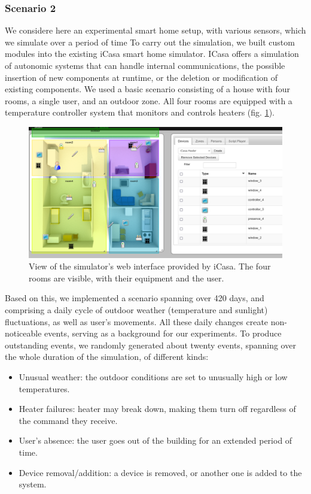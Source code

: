\documentclass[entropy,article,submit,moreauthors,pdftex]{Definitions/mdpi}
\begin{document}
\subsubsection{Scenario 2}
We considere here an experimental smart home setup, with various sensors, which we simulate over a period of time
To carry out the simulation, we built custom modules into the existing iCasa
smart home simulator\cite{lalanda_self-aware_2017}. ICasa
offers a simulation of autonomic systems that can handle internal communications,
the possible insertion of new components at runtime, or the deletion or modification of existing
components. We used a basic scenario consisting of a house with four rooms,
a single user, and an outdoor zone. All four rooms are equipped
with a temperature controller system that monitors and controls heaters (fig.
\ref{fig:view}).

\begin{figure}[ht]
    \centering
    \includegraphics[width=\linewidth]{figures/simulator}
    \caption{View of the simulator's web interface provided by iCasa. The four
        rooms are visible, with their equipment and the user.}
    \label{fig:view}
\end{figure}

Based on this, we implemented a scenario spanning over 420 days, and
comprising a daily cycle of outdoor weather (temperature and sunlight) fluctuations, as well
as user's movements. All these daily changes create non-noticeable events,
serving as a background for our experiments. To produce outstanding
events, we randomly generated about twenty events, spanning over the whole
duration of the simulation, of different kinds:

\begin{itemize}
    \item Unusual weather: the outdoor conditions are set to unusually high or
          low temperatures.
    \item Heater failures: heater may break down, making them turn off regardless
          of the command they receive.
    \item User's absence: the user goes out of the building for an extended
          period of time.
    \item Device removal/addition: a device is removed, or another one is added
          to the system.
\end{itemize}
\end{document}
